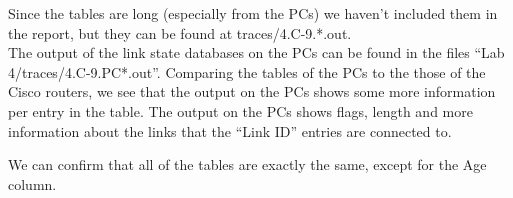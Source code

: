 Since the tables are long (especially from the PCs) we haven't included them in the report, but they can be found at traces/4.C-9.*.out. \\

The output of the link state databases on the PCs can be found in the files ``Lab 4/traces/4.C-9.PC*.out''. Comparing the tables of the PCs to the those of the Cisco routers, we see that the output on the PCs shows some more information per entry in the table. The output on the PCs shows flags, length and more information about the links that the ``Link ID'' entries are connected to.

We can confirm that all of the tables are exactly the same, except for the Age column.
